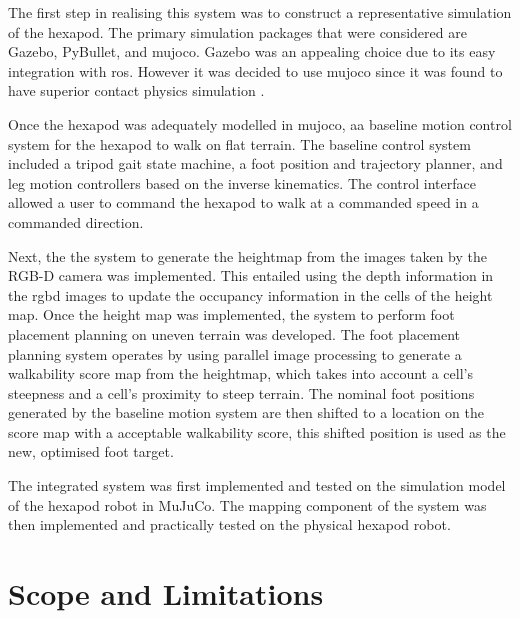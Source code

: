     The first step in realising this system was to construct a representative simulation of the hexapod. The primary simulation packages that were considered are Gazebo, PyBullet, and \ac{mujoco}.
    Gazebo was an appealing choice due to its easy integration with \acf{ros}. However it was decided to use \ac{mujoco} since it was found to have superior contact physics simulation \citep{Erez-2015}.

    Once the hexapod was adequately modelled in \ac{mujoco}, aa baseline motion control system for the hexapod to walk on flat terrain. The baseline control system included a tripod gait state machine,
    a foot position and trajectory planner, and leg motion controllers based on the inverse kinematics. The control interface allowed a user to command the hexapod to walk at a commanded speed in a commanded direction.

    Next, the the system to generate the heightmap from the images taken by the RGB-D camera was implemented. This entailed using the depth information in the \ac{rgbd} images
    to update the occupancy information in the cells of the height map.
    Once the height map was implemented, the system to perform foot placement planning on uneven terrain was developed. 
    The foot placement planning system operates by using parallel image processing to generate a
    walkability score map from the heightmap, which takes into account a cell's steepness and a cell's proximity to steep terrain.
    The nominal foot positions generated by the baseline motion system are then shifted to a location on 
    the score map with a acceptable walkability score, this shifted position is used as the new, optimised foot target.

    The integrated system was first implemented and tested on the simulation model of the hexapod robot in MuJuCo.
    The mapping component of the system was then implemented and practically tested on the physical hexapod robot.

\section{Scope and Limitations}


    
